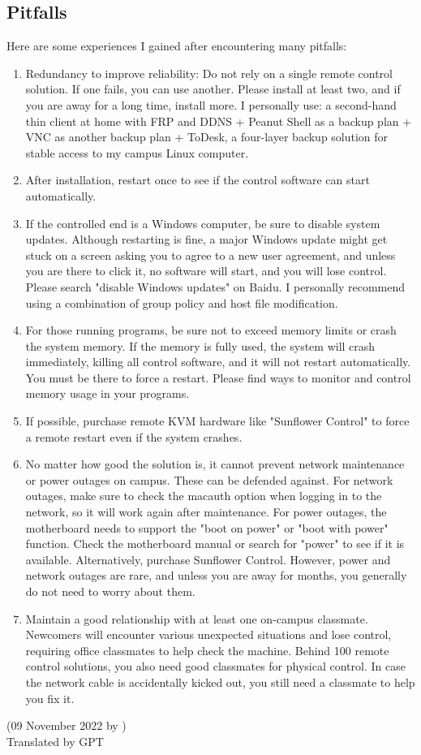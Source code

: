 \subsection{Pitfalls}
Here are some experiences I gained after encountering many pitfalls:
\begin{enumerate}
    \item Redundancy to improve reliability: Do not rely on a single remote control solution. If one fails, you can use another. Please install at least two, and if you are away for a long time, install more. I personally use: a second-hand thin client at home with FRP and DDNS + Peanut Shell as a backup plan + VNC as another backup plan + ToDesk, a four-layer backup solution for stable access to my campus Linux computer.
    \item After installation, restart once to see if the control software can start automatically.
    \item If the controlled end is a Windows computer, be sure to disable system updates. Although restarting is fine, a major Windows update might get stuck on a screen asking you to agree to a new user agreement, and unless you are there to click it, no software will start, and you will lose control. Please search "disable Windows updates" on Baidu. I personally recommend using a combination of group policy and host file modification.
    \item For those running programs, be sure not to exceed memory limits or crash the system memory. If the memory is fully used, the system will crash immediately, killing all control software, and it will not restart automatically. You must be there to force a restart. Please find ways to monitor and control memory usage in your programs.
    \item If possible, purchase remote KVM hardware like "Sunflower Control" to force a remote restart even if the system crashes.
    \item No matter how good the solution is, it cannot prevent network maintenance or power outages on campus. These can be defended against. For network outages, make sure to check the macauth option when logging in to the network, so it will work again after maintenance. For power outages, the motherboard needs to support the "boot on power" or "boot with power" function. Check the motherboard manual or search for "power" to see if it is available. Alternatively, purchase Sunflower Control. However, power and network outages are rare, and unless you are away for months, you generally do not need to worry about them.
    \item Maintain a good relationship with at least one on-campus classmate. Newcomers will encounter various unexpected situations and lose control, requiring office classmates to help check the machine. Behind 100 remote control solutions, you also need good classmates for physical control. In case the network cable is accidentally kicked out, you still need a classmate to help you fix it.
\end{enumerate}

\begin{flushright}
(09 November 2022 by \Wu) \\
Translated by GPT
\end{flushright}
